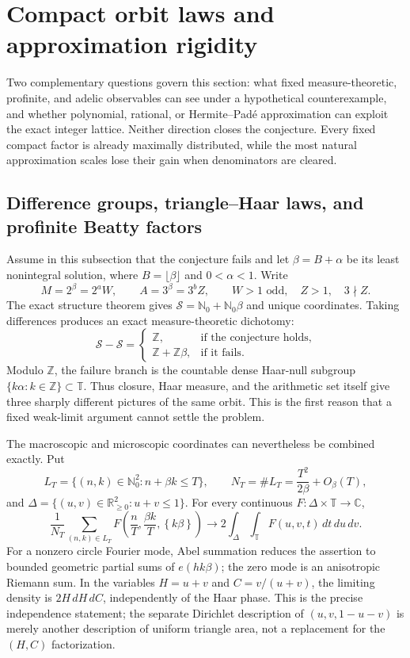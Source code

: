 \documentclass[11pt,oneside]{article}
\theoremstyle{definition}
\theoremstyle{remark}
\newcommand{\Nzero}{\mathbb N_0}
\newcommand{\Z}{\mathbb Z}
\newcommand{\R}{\mathbb R}
\newcommand{\C}{\mathbb C}
\newcommand{\Sol}{\mathcal S}
\newcommand{\fract}[1]{\left\{#1\right\}}
\begin{document}
\section{Compact orbit laws and approximation rigidity}
\label{sec:compact-approx}

Two complementary questions govern this section: what fixed measure-theoretic, profinite,
and adelic observables can see under a hypothetical counterexample, and whether polynomial,
rational, or Hermite--Pad\'e approximation can exploit the exact integer lattice.  Neither
direction closes the conjecture.  Every fixed compact factor is already maximally
distributed, while the most natural approximation scales lose their gain when denominators
are cleared.

\subsection{Difference groups, triangle--Haar laws, and profinite Beatty factors}
\label{ca:compact-laws}

Assume in this subsection that the conjecture fails and let $\beta=B+\alpha$ be its least
nonintegral solution, where $B=\lfloor\beta\rfloor$ and $0<\alpha<1$.  Write
\[
 M=2^\beta=2^aW,\qquad A=3^\beta=3^bZ,
 \qquad W>1\text{ odd},\quad Z>1,\quad 3\nmid Z.
\]
The exact structure theorem gives
$\Sol=\Nzero+\Nzero\beta$ and unique coordinates.  Taking differences produces an exact
measure-theoretic dichotomy:
\begin{equation}
 \Sol-\Sol=
 \begin{cases}
   \Z,&\text{if the conjecture holds},\\
   \Z+\Z\beta,&\text{if it fails}.
 \end{cases}
 \label{ca:eq-difference-group}
\end{equation}
Modulo $\Z$, the failure branch is the countable dense Haar-null subgroup
$\{k\alpha:k\in\Z\}\subset\mathbb T$.  Thus closure, Haar measure, and the arithmetic set itself
give three sharply different pictures of the same orbit.  This is the first reason that a
fixed weak-limit argument cannot settle the problem.

The macroscopic and microscopic coordinates can nevertheless be combined exactly.  Put
\[
 L_T=\{(n,k)\in\Nzero^2:n+\beta k\le T\},
 \qquad N_T=\#L_T=\frac{T^2}{2\beta}+O_\beta(T),
\]
and $\Delta=\{(u,v)\in\R_{\ge0}^2:u+v\le1\}$.  For every continuous
$F:\Delta\times\mathbb T\to\C$,
\begin{equation}
 \frac1{N_T}\sum_{(n,k)\in L_T}
 F\!\left(\frac nT,\frac{\beta k}{T},\fract{k\beta}\right)
 \longrightarrow
 2\int_\Delta\int_{\mathbb T} F(u,v,t)\,dt\,du\,dv.
 \label{ca:eq-triangle-haar}
\end{equation}
For a nonzero circle Fourier mode, Abel summation reduces the assertion to bounded geometric
partial sums of $e(hk\beta)$; the zero mode is an anisotropic Riemann sum.  In the variables
$H=u+v$ and $C=v/(u+v)$, the limiting density is $2H\,dH\,dC$, independently of the Haar
phase.  This is the precise independence statement; the separate Dirichlet description of
$(u,v,1-u-v)$ is merely another description of uniform triangle area, not a replacement for
the $(H,C)$ factorization.
\end{document}
